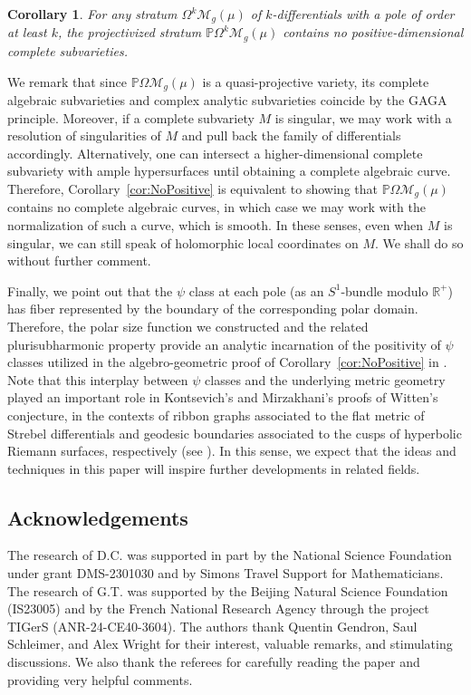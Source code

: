 \documentclass[11]{amsart}
\theoremstyle{plain}
\newtheorem{corollary}[theorem]{Corollary}
\theoremstyle{definition}
\begin{document}
\begin{corollary}\label{cor:k-diff}
    For any stratum $\Omega^k\mathcal{M}_{g}(\mu)$ of $k$-differentials with a pole of order at least $k$, the projectivized stratum $\mathbb P\Omega^k\mathcal M_{g}(\mu)$ contains no positive-dimensional complete subvarieties.  
\end{corollary}

We remark that since $\mathbb{P}\Omega\mathcal{M}_{g}(\mu)$ is a quasi-projective variety, its complete algebraic subvarieties and complex analytic subvarieties coincide by the GAGA principle. Moreover, if a complete subvariety $M$ is singular, we may work with a resolution of singularities of $M$ and pull back the family of differentials accordingly. Alternatively, one can intersect a higher-dimensional complete subvariety with ample hypersurfaces until obtaining a complete algebraic curve. Therefore, Corollary~\ref{cor:NoPositive} is equivalent to showing that $\mathbb{P}\Omega\mathcal{M}_{g}(\mu)$ contains no complete algebraic curves, in which case we may work with the normalization of such a curve, which is smooth. In these senses, even when $M$ is singular, we can still speak of holomorphic local coordinates on $M$. We shall do so without further comment. 

Finally, we point out that the $\psi$ class at each pole (as an $S^1$-bundle modulo $\mathbb R^{+}$) has fiber represented by the boundary of the corresponding polar domain. Therefore, the polar size function we constructed and the related plurisubharmonic property provide an analytic incarnation of the positivity of $\psi$ classes utilized in the algebro-geometric proof of Corollary~\ref{cor:NoPositive} in \cite{C19, C24}. Note that this interplay between $\psi$ classes and the underlying metric geometry played an important role in Kontsevich's and Mirzakhani's proofs of Witten's conjecture, in the contexts of ribbon graphs associated to the flat metric of Strebel differentials and geodesic boundaries associated to the cusps of hyperbolic Riemann surfaces, respectively (see \cite{Ko92, Mi07}). In this sense, we expect that the ideas and techniques in this paper will inspire further developments in related fields. 

\subsection*{Acknowledgements} The research of D.C. was supported in part by the National Science Foundation under grant DMS-2301030 and by Simons Travel Support for Mathematicians. The research of G.T. was supported by the Beijing Natural Science Foundation (IS23005) and by the French National Research Agency through the project TIGerS (ANR-24-CE40-3604). The authors thank Quentin Gendron, Saul Schleimer, and Alex Wright for their interest, valuable remarks, and stimulating discussions. We also thank the referees for carefully reading the paper and providing very helpful comments.
\end{document}
